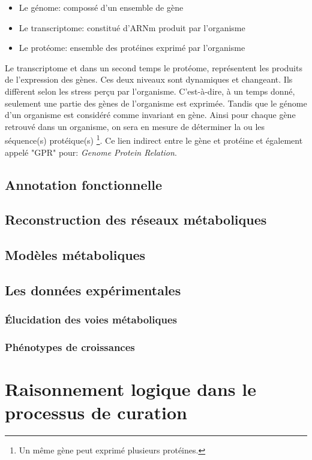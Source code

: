 \begin{refsection}
    \begin{itemize}
    	\item Le génome: compossé d'un ensemble de gène
    	\item Le transcriptome: constitué d'\gls{ARNm} produit par l'organisme
    	\item Le protéome: ensemble des protéines exprimé par l'organisme
    \end{itemize}

	Le transcriptome et dans un second temps le protéome, représentent les produits de l'expression des gènes. Ces deux niveaux sont dynamiques et changeant. Ils diffèrent selon les stress perçu par l'organisme. C'est-à-dire, à un temps donné, seulement une partie des gènes de l'organisme est exprimée. Tandis que le génome d'un organisme est considéré comme invariant en gène. Ainsi pour chaque gène retrouvé dans un organisme, on sera en mesure de déterminer la ou les séquence(s) protéique(s) \footnote{Un même gène peut exprimé plusieurs protéines.}. Ce lien indirect entre le gène et protéine et également appelé "GPR" pour: \textit{Genome Protein Relation}.
    
    \subsection{Annotation fonctionnelle}
    \subsection{Reconstruction des réseaux métaboliques}
    \subsection{Modèles métaboliques}
    \subsection{Les données expérimentales}
    \subsubsection{Élucidation des voies métaboliques}
    \subsubsection{Phénotypes de croissances}
    
    \section{Raisonnement logique dans le processus de curation}

\end{refsection}
